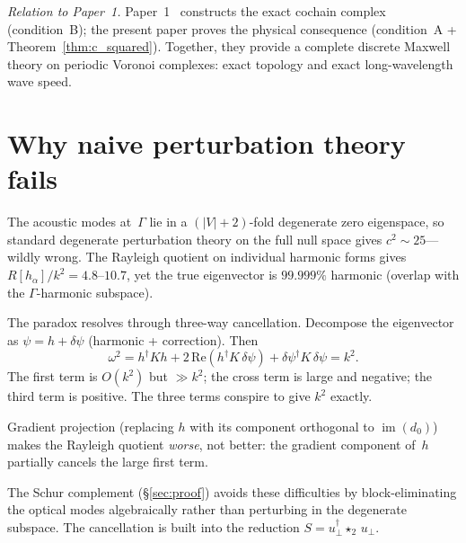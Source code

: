 \documentclass[preprint,12pt]{elsarticle}
\DeclareMathOperator{\im}{im}
\begin{document}
\emph{Relation to Paper~1.}
Paper~1~\cite{paper1} constructs the exact cochain complex (condition~B);
the present paper proves the physical consequence (condition~A +
Theorem~\ref{thm:c_squared}). Together, they provide a complete discrete
Maxwell theory on periodic Voronoi complexes: exact topology and exact
long-wavelength wave speed.


\appendix

\section{Why naive perturbation theory fails}
\label{app:naive_pt}

The acoustic modes at~$\Gamma$ lie in a $(|V|+2)$-fold degenerate zero
eigenspace, so standard degenerate perturbation theory on the full null
space gives $c^2 \sim 25$---wildly wrong. The Rayleigh quotient on
individual harmonic forms gives $R[h_\alpha]/k^2 = 4.8$--$10.7$, yet the
true eigenvector is $99.999\%$ harmonic (overlap with the $\Gamma$-harmonic
subspace).

The paradox resolves through three-way cancellation. Decompose the
eigenvector as $\psi = h + \delta\psi$ (harmonic + correction). Then
\begin{equation}
  \omega^2 = h^\dagger K h + 2\,\mathrm{Re}(h^\dagger K\, \delta\psi)
  + \delta\psi^\dagger K\, \delta\psi = k^2.
  \label{eq:cancellation}
\end{equation}
The first term is $O(k^2)$ but $\gg k^2$; the cross term is large and
negative; the third term is positive. The three terms conspire to give
$k^2$ exactly.

Gradient projection (replacing $h$ with its component orthogonal to
$\im(d_0)$) makes the Rayleigh quotient \emph{worse}, not better: the
gradient component of~$h$ partially cancels the large first term.

The Schur complement (\S\ref{sec:proof}) avoids these difficulties by
block-eliminating the optical modes algebraically rather than
perturbing in the degenerate subspace. The cancellation is built into
the reduction $S = u_\perp^\dagger \star_2\, u_\perp$.
\end{document}
